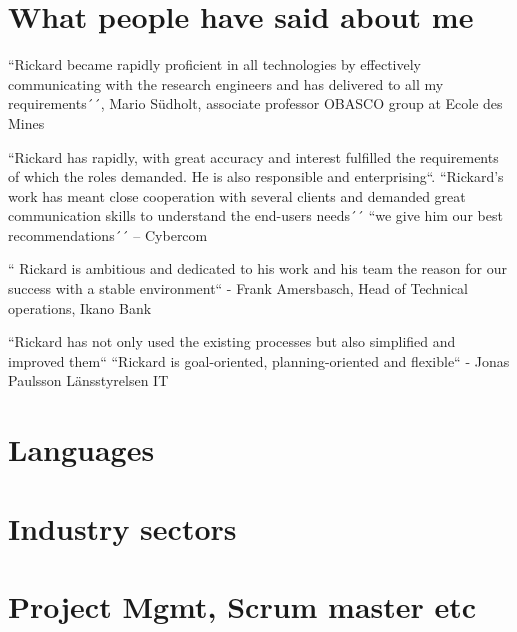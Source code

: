 \documentclass[11pt,a4paper,sans]{moderncv}        %
\begin{document}
\section{What people have said about me}
\large 

\begin{quotelist}
    \item
    ``Rickard became rapidly proficient in all technologies by effectively communicating with the research engineers and has delivered to all my requirements´´,
      Mario Südholt, associate professor OBASCO group at Ecole des Mines 
\item
        ``Rickard has rapidly, with great accuracy and interest fulfilled the requirements of which the roles demanded.  He is also responsible and enterprising``. ``Rickard’s work has meant close cooperation with several clients and demanded great communication skills to understand the end-users needs´´ 
        ``we give him our best recommendations´´ – Cybercom 
\item     
        `` Rickard is ambitious and dedicated to his work and his team the reason for our success with a stable environment``  - Frank Amersbasch, Head of Technical operations, Ikano Bank 
\item  ``Rickard has not only used the existing processes but also simplified and improved them`` ``Rickard is goal-oriented, planning-oriented and flexible``  - Jonas Paulsson Länsstyrelsen IT 
       
  \end{quotelist}

\section{Languages}

\section{Industry sectors}
\large
\section {Project Mgmt, Scrum master etc}
\end{document}
